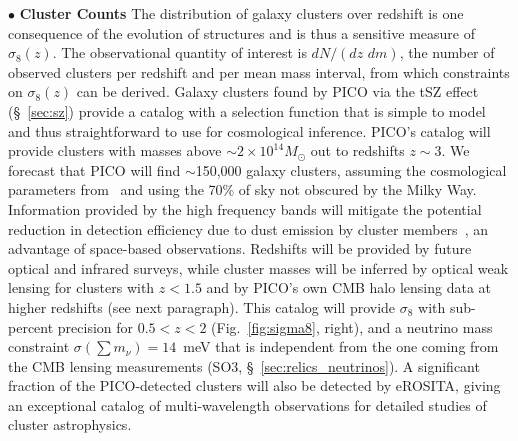 \documentclass[PICOAPC.tex]{subfiles}
\begin{document}
\noindent$\bullet$ {\bf Cluster Counts} \hspace{0.1in} \label{clusters}  
The distribution of galaxy clusters over redshift is one consequence of the evolution of structures and is thus a sensitive measure of $\sigma_{8}(z)$. The observational quantity of interest is $dN/(dz \,\, d m) $, the number of observed clusters per redshift and per mean mass interval, from which constraints on $\sigma_{8}(z)$ can be derived. Galaxy clusters found by PICO via the \ac{tSZ} effect (\S~\ref{sec:sz}) provide a catalog with a selection function that is simple to model and thus straightforward to use for cosmological inference. PICO's catalog will provide clusters with masses above $\sim2\times10^{14} M_\odot$ out to redshifts $z\sim3$. We forecast that PICO will find $\sim$150,000 galaxy clusters, assuming the cosmological parameters from \planck\  and using the 70\% of sky not obscured by the Milky Way.  Information provided by the high frequency bands will mitigate the potential reduction in detection efficiency due to dust emission by cluster members~\citep{melin_2018}, an advantage of space-based observations. Redshifts will be provided by future optical and infrared surveys, while cluster masses will be inferred by optical weak lensing for clusters with $z < 1.5$ and by PICO's own CMB halo lensing data at higher redshifts (see next paragraph).  This catalog will provide $\sigma_{8}$ with sub-percent precision for $0.5 < z < 2$ (Fig.~\ref{fig:sigma8}, right), and a neutrino mass constraint $\sigma(\sum m_{\nu}) = 14$~meV that is independent from the one coming from the CMB lensing measurements (SO3, \S~\ref{sec:relics_neutrinos}). A significant fraction of the PICO-detected clusters will also be detected by eROSITA, giving an exceptional catalog of multi-wavelength observations for detailed studies of cluster astrophysics. 
\end{document}
